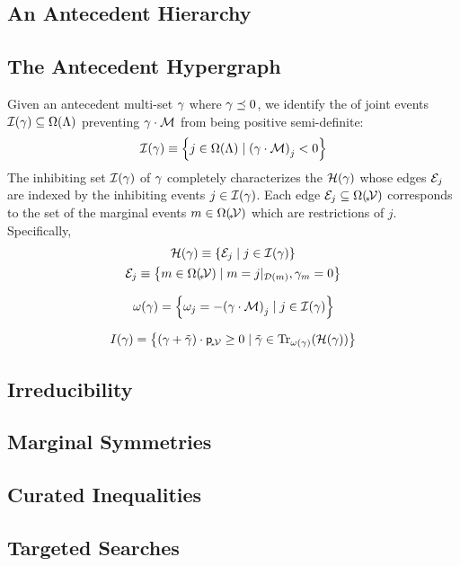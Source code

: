 \documentclass[aps, 10pt, english, twoside, twocolumn, pra, nofootinbib, tightenlines, longbibliography, superscriptaddress]{revtex4-1}
\begin{document}
    \subsection{An Antecedent Hierarchy}
    \subsection{The Antecedent Hypergraph}
    Given an antecedent multi-set $\gamma$ where $\gamma \preceq 0$, we identify the  of joint events $\inhibit{\ga} \subseteq \events{\jointvar}$ preventing $\gamma \cdot \mathcal{M}$ from being positive semi-definite:
    \[ \inhibit{\ga} \defined \bc{j \in \events{\jointvar} \mid \br{\ga\cdot\incidence}_{j} < 0} \]
    The inhibiting set $\inhibit{\ga}$ of $\gamma$ completely characterizes the  $\hypergraph\br{\ga}$ whose edges $\mathcal{E}_{j}$ are indexed by the inhibiting events $j \in \inhibit{\ga}$. Each edge $\edges_{j} \subseteq \events{\mscenariowrap}$ corresponds to the set of the marginal events $m \in \events{\mscenariowrap}$ which are restrictions of $j$. Specifically,
    \begin{gather*}
        \hypergraph\br{\ga} \defined \bc{\edges_j \mid j \in \inhibit{\ga}} \\
        \edges_{j} \defined \bc{m \in \events{\mscenariowrap} \mid m = \restrict{j}{\domain{m}}, \ga_{m} = 0}
    \end{gather*}

    \[ \w\br{\ga} = \bc{\w_j = - \br{\ga\cdot\incidence}_{j} \mid j \in \inhibit{\ga}} \]

    \[ I\br{\ga} = \bc{\br{\ga + \ti \ga} \cdot \prob{\mscenariowrap} \geq 0 \mid \ti \ga \in \transversals{\w\br{\ga}}{\hypergraph\br{\ga}}}\]

    \subsection{Irreducibility}
    \subsection{Marginal Symmetries}
    \label{sec:marginal_symmetries}
    \subsection{Curated Inequalities}
    \subsection{Targeted Searches}
\end{document}
